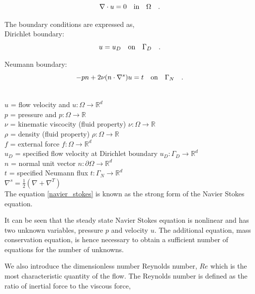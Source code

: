\documentclass[a4paper,openany]{book}
\begin{document}
\begin{equation}\label{mass_conservation}
\nabla \cdot u=0 \quad   \textnormal{in}  \quad \Omega \quad \textrm{.}
\end{equation}

The boundary conditions are expressed as,\\

Dirichlet boundary:
\begin{equation}\label{dirichlet_ns}
u=u_D \quad \textnormal{on} \quad \Gamma_D \quad \textrm{.}
\end{equation}

Neumann boundary:
\begin{equation} \label{neumann_ns}
-pn + 2\nu(n \cdot \nabla^s)u = t \quad   \textnormal{on}  \quad \Gamma_N \quad \textrm{.}
\end{equation}

$ $\\
$u$ = flow velocity and $u:\Omega \rightarrow \mathbb{R}^d$ \\
$p$ = pressure and $p:\Omega \rightarrow \mathbb{R}$\\
$\nu$ = kinematic viscocity (fluid property) $\nu:\Omega \rightarrow \mathbb{R}$\\ 
$\rho$ = density (fluid property) $\rho:\Omega \rightarrow \mathbb{R}$\\
$f$ = external force $f:\Omega \rightarrow \mathbb{R}^d$\\
$u_D$ = specified flow velocity at Dirichlet boundary $u_D:\Gamma_D \rightarrow \mathbb{R}^d$\\
$n$ = normal unit vector $n:\partial \Omega \rightarrow \mathbb{R}^d$\\
$t$ = specified Neumann flux $t:\Gamma_N \rightarrow \mathbb{R}^d$\\
$\nabla^s = \frac{1}{2}(\nabla + \nabla^T)$\\


The equation \eqref{navier_stokes} is known as the strong form of the Navier Stokes equation.

It can be seen that the steady state Navier Stokes equation is nonlinear and has two unknown variables, pressure $p$ and velocity $u$. The additional equation, mass conservation equation, is hence necessary to obtain a sufficient number of equations for the number of unknowns.

We also introduce the dimensionless number Reynolds number, $Re$ which is the most characteristic quantity of the flow. The Reynolds number is defined as the ratio of inertial force to the viscous force,
\end{document}

